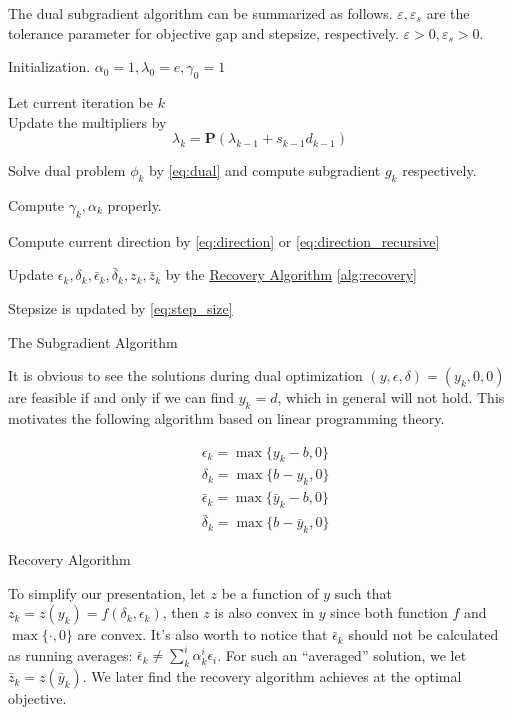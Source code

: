 \documentclass[../main]{subfiles}
\begin{document}
The dual subgradient algorithm can be summarized as follows.
\(\varepsilon,\varepsilon_s\) are the tolerance parameter for objective gap and stepsize, respectively.
\(\varepsilon > 0 ,\varepsilon_s > 0\).

\begin{algorithm}[H]
  \SetAlgoLined
  Initialization. \(\alpha_0 = 1, \lambda_0 = e, \gamma_0 = 1\)  \\
  {
    Let current iteration be \(k\)\\
    Update the multipliers by
    \[\lambda_{k} = \mathbf{P}(\lambda_{k-1} + s_{k-1}d_{k-1})\]

    Solve dual problem \(\phi_k\) by \eqref{eq:dual}
    and compute subgradient \(g_k\) respectively.

    Compute \(\gamma_k, \alpha_k\) properly.

    Compute current direction by \eqref{eq:direction} or \eqref{eq:direction_recursive}

    Update \(\epsilon_k,\delta_k ,\bar \epsilon_k ,\bar \delta_k, z_k, \bar z_k \)
    by the \underline{Recovery Algorithm} \ref{alg:recovery}

    Stepsize is updated by \eqref{eq:step_size}
  }
  \caption{The Subgradient Algorithm}
\end{algorithm}

It is obvious to see the solutions during dual optimization
\((y, \epsilon, \delta) = (y_k, 0, 0)\) are feasible if and only if we
can find \(y_k = d\), which in general will not hold. This motivates the following
algorithm based on linear programming theory.

\begin{algorithm}[H]\label{alg:recovery}
  \SetAlgoLined
  \begin{equation}\label{eq:recovery}
    \begin{aligned}
       & \epsilon_k = \max\{y_k - b, 0\}           \\
       & \delta_k = \max\{b - y_k, 0\}             \\
       & \bar \epsilon_k = \max\{\bar y_k - b, 0\} \\
       & \bar \delta_k = \max\{b - \bar y_k, 0\}
    \end{aligned}\end{equation}
  \caption{Recovery Algorithm}
\end{algorithm}

To simplify our presentation, let
\(z\) be a function of \(y\) such that \(z_k = z(y_k) = f(\delta_k, \epsilon_k)\), then \(z\) is
also convex in \(y\) since both function \(f\) and \(\max\{\cdot, 0\}\)
are convex. It's also worth to notice that \(\bar \epsilon_k\) should
not be calculated as running averages:
\(\bar \epsilon_k \neq \sum^i_k \alpha^i_k \epsilon_i\). For such an
``averaged'' solution, we let
\(\bar z_k = z(\bar y_k)\). We later find the recovery algorithm achieves
at the optimal objective.
\end{document}
